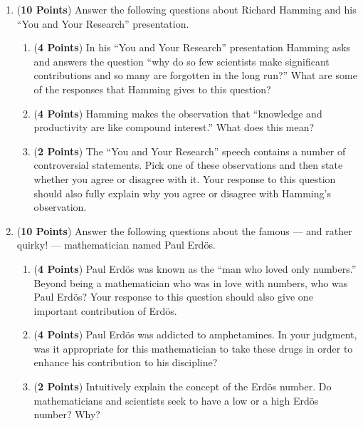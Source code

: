 \documentclass[12pt]{article}
\begin{document}
\begin{enumerate}

\item ({\bf 10 Points}) Answer the following questions about Richard
  Hamming and his ``You and Your Research'' presentation.

\begin{enumerate}

\item ({\bf 4 Points}) In his ``You and Your Research'' presentation
  Hamming asks and answers the question ``why do so few scientists
  make significant contributions and so many are forgotten in the long
  run?''  What are some of the responses that Hamming gives to this
  question?

\item ({\bf 4 Points}) Hamming makes the observation that ``knowledge
  and productivity are like compound interest.''  What does this mean?

\item ({\bf 2 Points}) The ``You and Your Research'' speech contains a
  number of controversial statements.  Pick one of these observations
  and then state whether you agree or disagree with it.  Your response
  to this question should also fully explain why you agree or
  disagree with Hamming's observation.

\end{enumerate}

\newpage

\item ({\bf 10 Points}) Answer the following questions about the
  famous --- and rather quirky! --- mathematician named Paul
  Erd\"{o}s.

\begin{enumerate}

\item ({\bf 4 Points}) Paul Erd\"{o}s was known as the ``man who loved
  only numbers.''  Beyond being a mathematician who was in love with
  numbers, who was Paul Erd\"{o}s?  Your response to this question
  should also give one important contribution of Erd\"{o}s.

\item ({\bf 4 Points}) Paul Erd\"{o}s was addicted to amphetamines.
  In your judgment, was it appropriate for this mathematician to take
  these drugs in order to enhance his contribution to his discipline?

\item ({\bf 2 Points}) Intuitively explain the concept of the
  Erd\"{o}s number.  Do mathematicians and scientists seek to have a
  low or a high Erd\"{o}s number?  Why?


\end{enumerate}
\end{enumerate}
\end{document}
